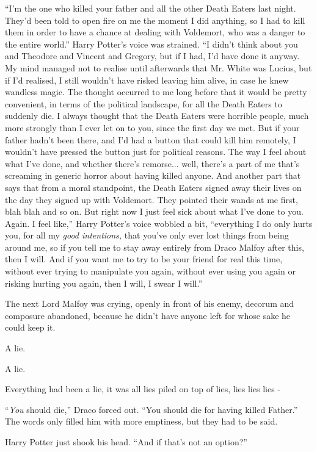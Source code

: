 ``I'm the one who killed your father and all the other Death Eaters last night. They'd been told to open fire on me the moment I did anything, so I had to kill them in order to have a chance at dealing with Voldemort, who was a danger to the entire world.'' Harry Potter's voice was strained. ``I didn't think about you and Theodore and Vincent and Gregory, but if I had, I'd have done it anyway. My mind managed not to realise until afterwards that Mr. White was Lucius, but if I'd realised, I still wouldn't have risked leaving him alive, in case he knew wandless magic. The thought occurred to me long before that it would be pretty convenient, in terms of the political landscape, for all the Death Eaters to suddenly die. I always thought that the Death Eaters were horrible people, much more strongly than I ever let on to you, since the first day we met. But if your father hadn't been there, and I'd had a button that could kill him remotely, I wouldn't have pressed the button just for political reasons. The way I feel about what I've done, and whether there's remorse... well, there's a part of me that's screaming in generic horror about having killed anyone. And another part that says that from a moral standpoint, the Death Eaters signed away their lives on the day they signed up with Voldemort. They pointed their wands at me first, blah blah and so on. But right now I just feel sick about what I've done to you. Again. I feel like,'' Harry Potter's voice wobbled a bit, ``everything I do only hurts you, for all my \emph{good intentions,} that you've only ever lost things from being around me, so if you tell me to stay away entirely from Draco Malfoy after this, then I will. And if you want me to try to be your friend for real this time, without ever trying to manipulate you again, without ever using you again or risking hurting you again, then I will, I swear I will.''

The next Lord Malfoy was crying, openly in front of his enemy, decorum and composure abandoned, because he didn't have anyone left for whose sake he could keep it.

A lie.

A lie.

Everything had been a lie, it was all lies piled on top of lies, lies lies lies -

``\emph{You} should die,'' Draco forced out. ``You should die for having killed Father.'' The words only filled him with more emptiness, but they had to be said.

Harry Potter just shook his head. ``And if that's not an option?''

